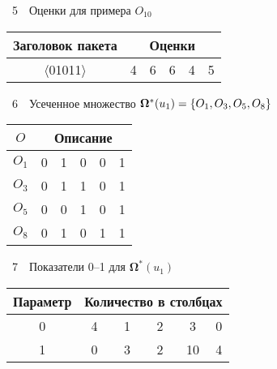 \begin{multicols}{2}
\vspace*{3pt}

\noindent
{\small
 \begin{center}  %
 \parbox{50mm}{{\tablename~5}\ \ \small{Оценки для примера $O_{10}$}}

\vspace*{2ex}

      \begin{tabular}{|c|c|c|c|c|c|}
\hline
Заголовок пакета& \multicolumn{5}{c|}{Оценки}\\
\hline
$\langle$01011$\rangle$ & \cellcolor[gray]{.6}4&6&6&4&5\\
\hline
\end{tabular}
\end{center}
}

\vspace*{3pt}

\noindent
{\small
 \begin{center}  %
 \parbox{50mm}{{\tablename~6}\ \ \small{Усеченное множество ${\boldsymbol{\Omega}}^*(u_1)\hm = \{O_1, O_3, O_5, O_8\}$}}

\vspace*{2ex}

      \tabcolsep=9pt
      \begin{tabular}{|c|c|c|c|c|c|}
\hline
$O$ &\multicolumn{5}{c|}{Описание}\\
\hline
$O_1$&\cellcolor[gray]{.6}0&1&0&0&1\\
$O_3$&\cellcolor[gray]{.6}0&1&1&0&1\\
$O_5$&\cellcolor[gray]{.6}0&0&1&0&1\\
$O_8$& \cellcolor[gray]{.6}0&1&0&1&1\\
\hline
\end{tabular}
\end{center}
}

\vspace*{3pt}


\noindent
{\small
 \begin{center}  %
 \parbox{54mm}{{\tablename~7}\ \ \small{Показатели 0--1 для ${\boldsymbol{\Omega}}^*(u_1)$}}

\vspace*{2ex}

      \begin{tabular}{|c|c|c|c|c|c|}
\hline
Параметр& \multicolumn{5}{c|}{Количество в столбцах}\\
\hline
0&\ 4\ &\ 1\ &\ 2\ &\ 3\ &0\\
1&0&3&2&10\hphantom{9}&4\\
\hline
\end{tabular}
\end{center}
}


\end{multicols}
